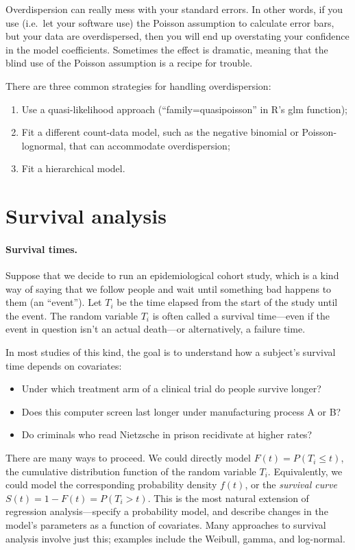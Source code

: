 \documentclass[11pt]{article}
\newcommand{\1}[1]{\mathbf{1}_{\{ {#1} \}}}
\begin{document}
Overdispersion can really mess with your standard errors.  In other words, if you use (i.e.~let your software use) the Poisson assumption to calculate error bars, but your data are overdispersed, then you will end up overstating your confidence in the model coefficients.  Sometimes the effect is dramatic, meaning that the blind use of the Poisson assumption is a recipe for trouble.

There are three common strategies for handling overdispersion:
\begin{enumerate}
\item Use a quasi-likelihood approach (``family=quasipoisson'' in R's glm function);
\item Fit a different count-data model, such as the negative binomial or Poisson-lognormal, that can accommodate overdispersion;
\item Fit a hierarchical model.
\end{enumerate}


\section{Survival analysis}

\paragraph{Survival times.} Suppose that we decide to run an epidemiological cohort study, which is a kind way of saying that we follow people and wait until something bad happens to them (an ``event'').  Let $T_i$ be the time elapsed from the start of the study until the event.  The random variable $T_i$ is often called a survival time---even if the event in question isn't an actual death---or alternatively, a failure time.

In most studies of this kind, the goal is to understand how a subject's survival time depends on covariates:
\begin{itemize}
\item Under which treatment arm of a clinical trial do people survive longer?
\item Does this computer screen last longer under manufacturing process A or B?
\item Do criminals who read Nietzsche in prison recidivate at higher rates?
\end{itemize}

There are many ways to proceed.  We could directly model $F(t) = P(T_i \leq t)$, the cumulative distribution function of the random variable $T_i$.  Equivalently, we could model the corresponding probability density $f(t)$, or the \textit{survival curve} $S(t) = 1 - F(t) = P(T_i > t)$.  This is the most natural extension of regression analysis---specify a probability model, and describe changes in the model's parameters as a function of covariates.  Many approaches to survival analysis involve just this; examples include the Weibull, gamma, and log-normal.
\end{document}

